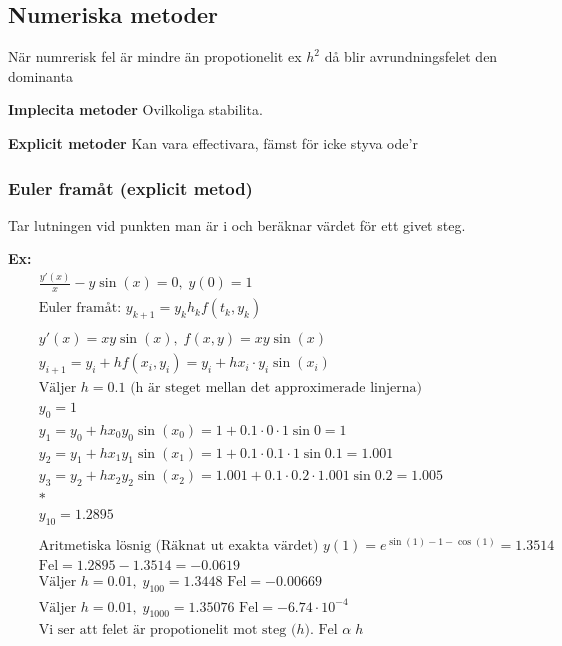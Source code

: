 \subsection{Numeriska metoder}
När numrerisk fel är mindre än propotionelit ex $h^2$ då blir avrundningsfelet den dominanta

\textbf{Implecita metoder}
Ovilkoliga stabilita.

\textbf{Explicit metoder}
Kan vara effectivara, fämst för icke styva ode'r
 
\newpage
\subsubsection{Euler framåt (explicit metod)}
Tar lutningen vid punkten man är i och beräknar värdet för ett givet steg.

\textbf{Ex:}
\begin{align*}
  &\quad  \frac{y'(x)}{x} - y\sin{(x)} = 0, \; y(0)=1 \\
  &\quad  \text{Euler framåt: } y_{k+1} = y_k h_kf(t_k,y_k) \\
  &\quad  \\
  &\quad  y'(x) = xy\sin{(x)}, \; f(x,y) = xy\sin{(x)} \\
  &\quad  y_{i+1} = y_i + hf(x_i,y_i) = y_i+hx_i\cdot{y_i\sin{(x_i)}} \\
  &\quad  \text{Väljer $h=0.1$ (h är steget mellan det approximerade linjerna)} \\
  &\quad  y_0 = 1 \\
  &\quad  y_1 = y_0+hx_0y_0\sin{(x_0)} = 1+0.1\cdot0\cdot1\sin{0} = 1 \\
  &\quad  y_2 = y_1+hx_1y_1\sin{(x_1)} = 1+0.1\cdot0.1\cdot1\sin{0.1} = 1.001 \\
  &\quad  y_3 = y_2+hx_2y_2\sin{(x_2)} = 1.001+0.1\cdot0.2\cdot1.001\sin{0.2} = 1.005 \\
  &\quad  * \\
  &\quad  y_{10} = 1.2895 \\
  &\quad  \\
  &\quad  \text{Aritmetiska lösnig (Räknat ut exakta värdet) }
  y(1)=e^{\sin{(1)-1-\cos{(1)}}} = 1.3514 \\
  &\quad  \text{Fel} = 1.2895-1.3514 = -0.0619 \\
  &\quad  \text{Väljer } h=0.01, \; y_{100} = 1.3448 \text{ Fel} = -0.00669 \\
  &\quad  \text{Väljer } h=0.01, \; y_{1000} = 1.35076 \text{ Fel} = -6.74\cdot10^{-4} \\
  &\quad  \text{Vi ser att felet är propotionelit mot steg ($h$). Fel } \alpha \; h \\
\end{align*}

